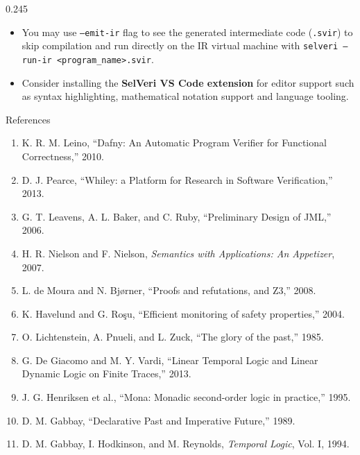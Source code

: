 \documentclass[final]{beamer}
\newcommand{\posterbodyfont}{\fontsize{24}{31}\selectfont}
\begin{document}
\begin{frame}[t,fragile]
\begin{columns}[t,totalwidth=\textwidth]
\begin{column}{0.245\textwidth}
\begin{posterbox}[height=17.4cm,compactboxtitle]{}
{\begin{itemize}
  \item You may use \texttt{--emit-ir} flag to see the generated intermediate code (\texttt{.svir}) to skip compilation and run directly on the IR virtual machine with \texttt{selveri --run-ir <program\_name>.svir}.

  \item Consider installing the \textbf{SelVeri VS Code extension} for editor support such as syntax highlighting, mathematical notation support and language tooling.
\end{itemize}
}
\end{posterbox}

\vspace{0.25cm}

\begin{posterbox}[height=23.91cm,compactboxtitle]{References}
{\posterbodyfont
\begin{enumerate}
  \setlength{\itemsep}{0.03cm}
  \item K. R. M. Leino, ``Dafny: An Automatic Program Verifier for Functional Correctness,'' 2010.
  \item D. J. Pearce, ``Whiley: a Platform for Research in Software Verification,'' 2013.
  \item G. T. Leavens, A. L. Baker, and C. Ruby, ``Preliminary Design of JML,'' 2006.
  \item H. R. Nielson and F. Nielson, \emph{Semantics with Applications: An Appetizer}, 2007.
  \item L. de Moura and N. Bj{\o}rner, ``Proofs and refutations, and Z3,'' 2008.
  \item K. Havelund and G. Ro\c{s}u, ``Efficient monitoring of safety properties,'' 2004.
  \item O. Lichtenstein, A. Pnueli, and L. Zuck, ``The glory of the past,'' 1985.
  \item G. De Giacomo and M. Y. Vardi, ``Linear Temporal Logic and Linear Dynamic Logic on Finite Traces,'' 2013.
  \item J. G. Henriksen et al., ``Mona: Monadic second-order logic in practice,'' 1995.
  \item D. M. Gabbay, ``Declarative Past and Imperative Future,'' 1989.
  \item D. M. Gabbay, I. Hodkinson, and M. Reynolds, \emph{Temporal Logic}, Vol. I, 1994.
\end{enumerate}
}
\end{posterbox}
\end{column}

\end{columns}


\end{frame}
\end{document}
